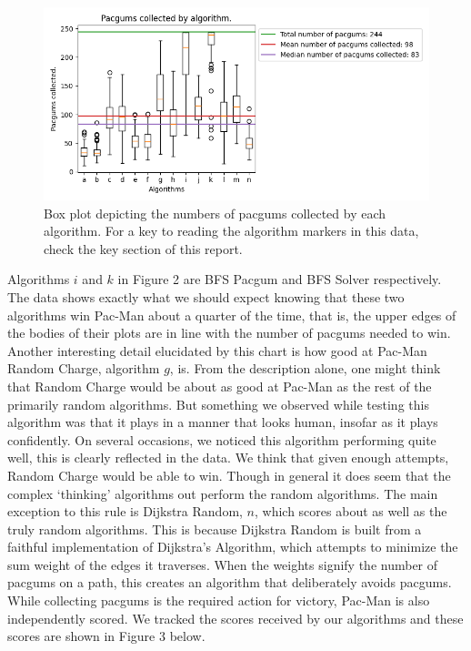 \documentclass[12pt]{article}
\begin{document}
    \begin{figure}[H]
      \begin{center}
        \includegraphics[width = .885\linewidth]{../../graphs/gums.png}
        \captionsetup{width = .885\linewidth}
        \caption{Box plot depicting the numbers of pacgums collected by each algorithm. For a key to reading the algorithm markers in this data, check the key section of this report.}
      \end{center}
    \end{figure}
    Algorithms $i$ and $k$ in Figure 2 are BFS Pacgum and BFS Solver respectively. The data shows exactly what we should expect knowing that these two algorithms win Pac-Man about a quarter of the time, that is, the upper edges of the bodies of their plots are in line with the number of pacgums needed to win. Another interesting detail elucidated by this chart is how good at Pac-Man Random Charge, algorithm $g$, is. From the description alone, one might think that Random Charge would be about as good at Pac-Man as the rest of the primarily random algorithms. But something we observed while testing this algorithm was that it plays in a manner that looks human, insofar as it plays confidently. On several occasions, we noticed this algorithm performing quite well, this is clearly reflected in the data. We think that given enough attempts, Random Charge would be able to win. Though in general it does seem that the complex `thinking' algorithms out perform the random algorithms. The main exception to this rule is Dijkstra Random, $n$, which scores about as well as the truly random algorithms. This is because Dijkstra Random is built from a faithful implementation of Dijkstra's Algorithm, which attempts to minimize the sum weight of the edges it traverses. When the weights signify the number of pacgums on a path, this creates an algorithm that deliberately avoids pacgums. While collecting pacgums is the required action for victory, Pac-Man is also independently scored. We tracked the scores received by our algorithms and these scores are shown in Figure 3 below.
\end{document}
